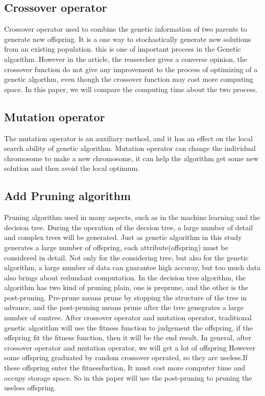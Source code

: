 \documentclass[12pt]{article}
\begin{document}
\subsection{Crossover operator }
Crossover operator used to combine the genetic information of two parents to generate new offspring. It is a one way to stochastically generate new solutions from an existing population. this is one of important process in the Genetic algorithm. However in the article\cite{Osaba2013}, the reasercher gives a converse opinion, the crossover function do not give any improvement to the process of optimizing of a genetic algorthm, even though the crossover function may cost more computing space. In this paper, we will compare the computing time about the two process.

\subsection{Mutation operator}
The mutation operator is an auxiliary method, and it has an effect on the local search ability of genetic algorithm. Mutation operator can change the individual chromosome to make a new chromosome, it can help the algorithm get some new solution and then avoid the local optimum.
\subsection{Add Pruning algorithm}
Pruning algorithm used in many aspects, such as in the machine learning and the decision tree. During the operation of the decsion tree, a large number of detail and complex trees will be generated. Just as genetic algorithm in this study generates a large number of offspring, each attribute(offspring) must be considered in detail. Not only for the considering tree, but also for the genetic algorithm, a large number of data can guarantee high accuray, but too much data also brings about redundant computation.  In the decision tree algorithm, the algorithm has two kind of pruning plain, one is preprune, and the other is the post-pruning. Pre-prune means prune  by stopping the structure of the tree in advance, and the post-pruning means prune after the tree genegrates a large number of suntree. After crossover operator and mutation operator, traditional genetic algorithm will use the fitness function to judgement the offspring, if the offspring fit the fitness function, then it will be the end result. In general, after crossover operator and mutation operator, we will get a lot of offspring However some offspring graduated by random crossover operated, so they are useless.If these offspring enter the fitnessfuction, It must cost more computer time and occupy storage space. So in this paper will use the post-pruning to pruning the useless offspring. 
\end{document}
